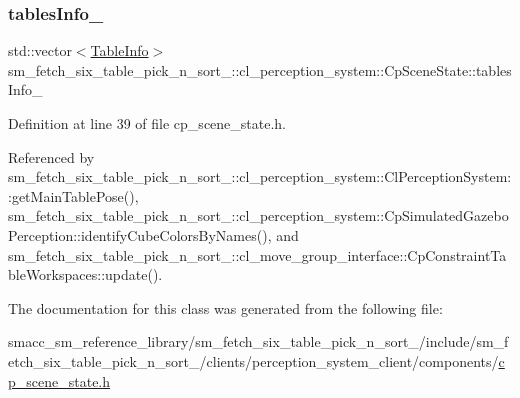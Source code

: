 \subsubsection{\texorpdfstring{tables\+Info\+\_\+}{tablesInfo\_}}
{\footnotesize\ttfamily std\+::vector$<$\hyperlink{structsm__fetch__six__table__pick__n__sort__1_1_1cl__perception__system_1_1TableInfo}{Table\+Info}$>$ sm\+\_\+fetch\+\_\+six\+\_\+table\+\_\+pick\+\_\+n\+\_\+sort\+\_\+::cl\+\_\+perception\+\_\+system\+::\+Cp\+Scene\+State\+::tables\+Info\+\_\+}



Definition at line 39 of file cp\+\_\+scene\+\_\+state.\+h.



Referenced by sm\+\_\+fetch\+\_\+six\+\_\+table\+\_\+pick\+\_\+n\+\_\+sort\+\_\+::cl\+\_\+perception\+\_\+system\+::\+Cl\+Perception\+System\+::get\+Main\+Table\+Pose(), sm\+\_\+fetch\+\_\+six\+\_\+table\+\_\+pick\+\_\+n\+\_\+sort\+\_\+::cl\+\_\+perception\+\_\+system\+::\+Cp\+Simulated\+Gazebo\+Perception\+::identify\+Cube\+Colors\+By\+Names(), and sm\+\_\+fetch\+\_\+six\+\_\+table\+\_\+pick\+\_\+n\+\_\+sort\+\_\+::cl\+\_\+move\+\_\+group\+\_\+interface\+::\+Cp\+Constraint\+Table\+Workspaces\+::update().



The documentation for this class was generated from the following file\+:\begin{DoxyCompactItemize}
\item 
smacc\+\_\+sm\+\_\+reference\+\_\+library/sm\+\_\+fetch\+\_\+six\+\_\+table\+\_\+pick\+\_\+n\+\_\+sort\+\_/include/sm\+\_\+fetch\+\_\+six\+\_\+table\+\_\+pick\+\_\+n\+\_\+sort\+\_/clients/perception\+\_\+system\+\_\+client/components/\hyperlink{cp__scene__state_8h}{cp\+\_\+scene\+\_\+state.\+h}\end{DoxyCompactItemize}
